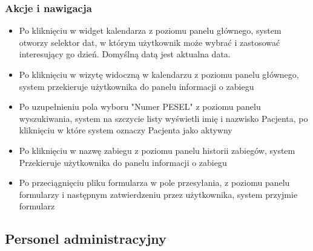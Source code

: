 \subsubsection{Akcje i nawigacja}
\begin{itemize}
    \item Po kliknięciu w widget kalendarza z poziomu panelu głównego, system otworzy selektor dat, w którym użytkownik może wybrać i zastosować interesujący go dzień. Domyślną datą jest aktualna data.
    \item Po kliknięciu w wizytę widoczną w kalendarzu z poziomu panelu głównego, system przekieruje użytkownika do panelu informacji o zabiegu
    \item Po uzupełnieniu pola wyboru "Numer PESEL" z poziomu panelu wyszukiwania, system na szczycie listy wyświetli imię i nazwisko Pacjenta, po kliknięciu w które system oznaczy Pacjenta jako aktywny
    \item Po kliknięciu w nazwę zabiegu z poziomu panelu historii zabiegów, system Przekieruje użytkownika do panelu informacji o zabiegu
    \item Po przeciągnięciu pliku formularza w pole przesyłania, z poziomu panelu formularzy i następnym zatwierdzeniu przez użytkownika, system przyjmie formularz
    \end{itemize}

\subsection{Personel administracyjny}
